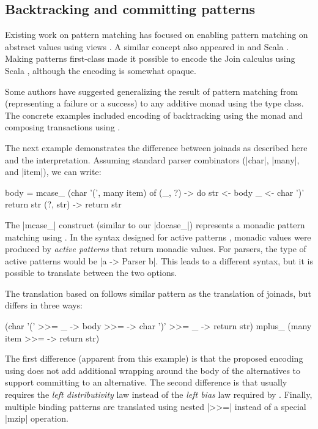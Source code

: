 \documentclass{sigplanconf}
\begin{document}

\subsection{Backtracking and committing patterns}
\label{sec:related-monadplus}

Existing work on pattern matching has focused on enabling pattern matching on abstract values 
using views \cite{views-haskell}. A similar concept also appeared in \fsharp and Scala 
\cite{scala-patternmatching, activepatterns}. Making patterns first-class made it possible to encode 
the Join calculus using Scala \cite{scala-encodingjoins}, although the encoding is somewhat opaque.

Some authors \cite{firstlcasspats, activepatterns} have suggested generalizing the result of 
pattern matching from  (representing a failure or a success) to any additive monad 
using the  type class. The concrete examples included encoding of backtracking 
using the  monad and composing transactions using .

The next example demonstrates the difference between joinads as described here and the 
interpretation. Assuming standard parser combinators (|char|, |many|, and |item|), 
we can write:

\begin{code}
body = mcase_ (char '(', many item) of 
  (_, ?)    -> do  str <- body
                   _ <- char ')'
                   return str
  (?, str)  -> return str
\end{code}
The |mcase_| construct (similar to our |docase_|) represents a monadic pattern matching using 
. In the syntax designed for active patterns \cite{activepatterns}, monadic 
values were produced by \textit{active patterns} that return monadic values. For parsers, the 
type of active patterns would be |a -> Parser b|. This leads to a different syntax, but it is 
possible to translate between the two options.

The translation based on  follows similar pattern as the translation of joinads,
but differs in three ways:

\begin{code}
(char '(' >>= \_ -> body >>= \str ->
    char ')' >>= \_ -> return str) mplus_
(many item >>= \str -> return str)
\end{code}
The first difference (apparent from this example) is that the proposed encoding using 
does not add additional wrapping around the body of the alternatives to support committing to an 
alternative. The second difference is that  usually requires the \textit{left
distributivity} law instead of the \textit{left bias} law required by . Finally, 
multiple binding patterns are translated using nested |>>=| instead of a special |mzip| operation.
\end{document}
